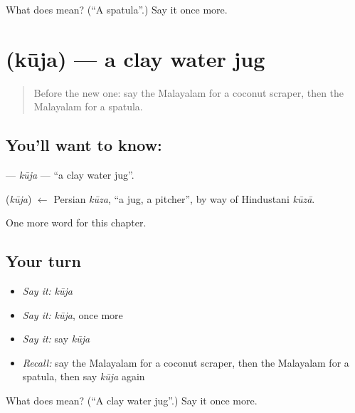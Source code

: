 \begin{tcolorbox}[breakable,colback=teal!4,colframe=teal!35!black,title={Before you move on}]
What does  mean? (\textquotedblleft{}A spatula\textquotedblright{}.) Say it once more.
\end{tcolorbox}
\section[\texorpdfstring{\ml{കൂജ} (kūja)}{കൂജ (kūja)}]{ (kūja) — a clay water jug}

\label{lesson:ML-C331-kuja}



\begin{quote}
Before the new one: say the Malayalam for a coconut scraper, then the Malayalam for a spatula.
\end{quote}

\subsection*{You'll want to know: }
\textbf{} — \emph{kūja} — \textquotedblleft{}a clay water jug\textquotedblright{}.

\begin{cousinweb}
\textbf{} (\emph{kūja}) $\leftarrow$ Persian \emph{kūza}, \textquotedblleft{}a jug, a pitcher\textquotedblright{}, by way of Hindustani \emph{kūzā}.
\end{cousinweb}

\begin{grammarlens}[title={What you've built}]
One more word for this chapter.
\end{grammarlens}

\subsection*{Your turn}
\begin{itemize}
\raggedright
  \item \emph{Say it:} \emph{kūja}
  \item \emph{Say it:} \emph{kūja}, once more
  \item \emph{Say it:} say \emph{kūja}
  \item \emph{Recall:} say the Malayalam for a coconut scraper, then the Malayalam for a spatula, then say \emph{kūja} again
\end{itemize}

\begin{tcolorbox}[breakable,colback=teal!4,colframe=teal!35!black,title={Before you move on}]
What does  mean? (\textquotedblleft{}A clay water jug\textquotedblright{}.) Say it once more.
\end{tcolorbox}
